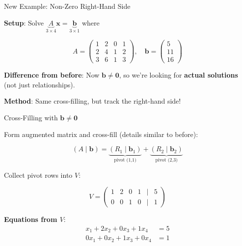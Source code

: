 \documentclass[10pt]{beamer}
\theoremstyle{definition}
\newcommand{\x}[1]{\alert{\textbf{#1}}}
\begin{document}
\begin{frame}{New Example: Non-Zero Right-Hand Side}

\x{Setup}: Solve $\underbrace{A}_{3 \times 4}\mathbf{x} = \underbrace{\mathbf{b}}_{3 \times 1}$ where

$$A = \begin{pmatrix}
1 & 2 & 0 & 1 \\
2 & 4 & 1 & 2 \\
3 & 6 & 1 & 3
\end{pmatrix}, \quad \mathbf{b} = \begin{pmatrix} 5 \\ 11 \\ 16 \end{pmatrix}$$

\vspace{1em}

\x{Difference from before}: Now $\mathbf{b} \neq \mathbf{0}$, so we're looking for \textbf{actual solutions} (not just relationships).

\vspace{0.5em}

\x{Method}: Same cross-filling, but track the right-hand side!

\end{frame}

\begin{frame}[fragile]{Cross-Filling with $\mathbf{b} \neq \mathbf{0}$}

Form augmented matrix and cross-fill (details similar to before):

\vspace{0.5em}

$$(A \mid \mathbf{b}) = \underbrace{(R_1 \mid \mathbf{b}_1)}_{\text{pivot (1,1)}} + \underbrace{(R_2 \mid \mathbf{b}_2)}_{\text{pivot (2,3)}}$$

\vspace{0.5em}

Collect pivot rows into $V$:

$$V = \begin{pmatrix}
1 & 2 & 0 & 1 & \mid & 5 \\
0 & 0 & 1 & 0 & \mid & 1
\end{pmatrix}$$

\vspace{1em}

\x{Equations from $V$}:
\begin{align*}
x_1 + 2x_2 + 0x_3 + 1x_4 &= 5 \\
0x_1 + 0x_2 + 1x_3 + 0x_4 &= 1
\end{align*}

\end{frame}
\end{document}
